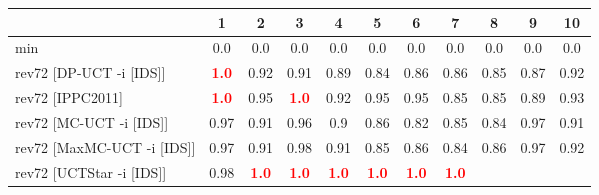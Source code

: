 \documentclass{article}
\begin{document}
\begin{tabular}{|l|r@{$\pm$}rr@{$\pm$}rr@{$\pm$}rr@{$\pm$}rr@{$\pm$}rr@{$\pm$}rr@{$\pm$}rr@{$\pm$}rr@{$\pm$}rr@{$\pm$}r|}
\hline

& \multicolumn{2}{c}{1}
& \multicolumn{2}{c}{2}
& \multicolumn{2}{c}{3}
& \multicolumn{2}{c}{4}
& \multicolumn{2}{c}{5}
& \multicolumn{2}{c}{6}
& \multicolumn{2}{c}{7}
& \multicolumn{2}{c}{8}
& \multicolumn{2}{c}{9}
& \multicolumn{2}{c|}{10}
\\
\hline
\hline
min
& \multicolumn{2}{c}{0.0}
& \multicolumn{2}{c}{0.0}
& \multicolumn{2}{c}{0.0}
& \multicolumn{2}{c}{0.0}
& \multicolumn{2}{c}{0.0}
& \multicolumn{2}{c}{0.0}
& \multicolumn{2}{c}{0.0}
& \multicolumn{2}{c}{0.0}
& \multicolumn{2}{c}{0.0}
& \multicolumn{2}{c|}{0.0}
\\
rev72 [DP-UCT -i [IDS]]
& \multicolumn{2}{c}{\textbf{\textcolor{red}{1.0}}}
& \multicolumn{2}{c}{0.92}
& \multicolumn{2}{c}{0.91}
& \multicolumn{2}{c}{0.89}
& \multicolumn{2}{c}{0.84}
& \multicolumn{2}{c}{0.86}
& \multicolumn{2}{c}{0.86}
& \multicolumn{2}{c}{0.85}
& \multicolumn{2}{c}{0.87}
& \multicolumn{2}{c|}{0.92}
\\
rev72 [IPPC2011]
& \multicolumn{2}{c}{\textbf{\textcolor{red}{1.0}}}
& \multicolumn{2}{c}{0.95}
& \multicolumn{2}{c}{\textbf{\textcolor{red}{1.0}}}
& \multicolumn{2}{c}{0.92}
& \multicolumn{2}{c}{0.95}
& \multicolumn{2}{c}{0.95}
& \multicolumn{2}{c}{0.85}
& \multicolumn{2}{c}{0.85}
& \multicolumn{2}{c}{0.89}
& \multicolumn{2}{c|}{0.93}
\\
rev72 [MC-UCT -i [IDS]]
& \multicolumn{2}{c}{0.97}
& \multicolumn{2}{c}{0.91}
& \multicolumn{2}{c}{0.96}
& \multicolumn{2}{c}{0.9}
& \multicolumn{2}{c}{0.86}
& \multicolumn{2}{c}{0.82}
& \multicolumn{2}{c}{0.85}
& \multicolumn{2}{c}{0.84}
& \multicolumn{2}{c}{0.97}
& \multicolumn{2}{c|}{0.91}
\\
rev72 [MaxMC-UCT -i [IDS]]
& \multicolumn{2}{c}{0.97}
& \multicolumn{2}{c}{0.91}
& \multicolumn{2}{c}{0.98}
& \multicolumn{2}{c}{0.91}
& \multicolumn{2}{c}{0.85}
& \multicolumn{2}{c}{0.86}
& \multicolumn{2}{c}{0.84}
& \multicolumn{2}{c}{0.86}
& \multicolumn{2}{c}{0.97}
& \multicolumn{2}{c|}{0.92}
\\
rev72 [UCTStar -i [IDS]]
& \multicolumn{2}{c}{0.98}
& \multicolumn{2}{c}{\textbf{\textcolor{red}{1.0}}}
& \multicolumn{2}{c}{\textbf{\textcolor{red}{1.0}}}
& \multicolumn{2}{c}{\textbf{\textcolor{red}{1.0}}}
& \multicolumn{2}{c}{\textbf{\textcolor{red}{1.0}}}
& \multicolumn{2}{c}{\textbf{\textcolor{red}{1.0}}}
& \multicolumn{2}{c}{\textbf{\textcolor{red}{1.0}}}

\end{tabular}
\end{document}
